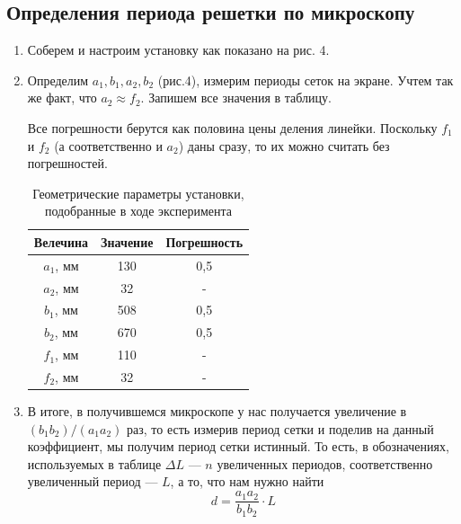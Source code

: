 \documentclass[a4paper, 12pt]{article}%
\begin{document}
\subsection{Определения периода решетки по микроскопу}
\begin{enumerate}
\item Соберем и настроим установку как показано на рис. 4.
\item Определим $a_1, b_1, a_2, b_2$ (рис.4), измерим периоды сеток на экране. Учтем так же факт, что $a_2 \approx f_2$. Запишем все значения в таблицу. 

Все погрешности берутся как половина цены деления линейки. Поскольку $f_1$ и $f_2$ (а соответственно и $a_2$) даны сразу, то их можно считать без погрешностей.

\begin{table}[h!]
\begin{center}
\begin{tabular}{|c|c|c|}
\hline
Велечина  & Значение & Погрешность \\ \hline
$a_1$, мм & 130      & 0,5         \\ \hline
$a_2$, мм & 32       & -           \\ \hline
$b_1$, мм & 508      & 0,5         \\ \hline
$b_2$, мм & 670      & 0,5         \\ \hline
$f_1$, мм & 110      & -           \\ \hline
$f_2$, мм & 32       & -           \\ \hline
\end{tabular}
\caption{Геометрические параметры установки, подобранные в ходе эксперимента}
\end{center}
\end{table}
\item В итоге, в получившемся микроскопе у нас получается увеличение в $(b_1b_2)/(a_1a_2)$ раз, то есть измерив период сетки и поделив на данный коэффициент, мы получим период сетки истинный.  То есть, в обозначениях, используемых в таблице $\Delta L$ --- $n$ увеличенных периодов, соответственно увеличенный период --- $L$, а то, что нам нужно найти 
\[d = \dfrac{a_1 a_2}{b_1 b_2} \cdot L\]


\end{enumerate}
\end{document}
